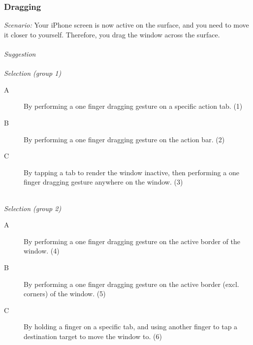 
\subsubsection{Dragging}
\emph{Scenario:}
Your iPhone screen is now active on the surface, and you need to move it closer to yourself. Therefore, you drag the window across the surface.
\hfill\\
\hfill\\
\emph{Suggestion}
\hfill\\
\hfill\\
\emph{Selection (group 1)}
\begin{description}
\item[A]{By performing a one finger dragging gesture on a specific action tab. (1)}
\item[B]{By performing a one finger dragging gesture on the action bar. (2)}
\item[C]{By tapping a tab to render the window inactive, then performing a one finger dragging gesture anywhere on the window. (3)}
\end{description}
\hfill\\
\emph{Selection (group 2)}
\begin{description}
\item[A]{By performing a one finger dragging gesture on the active border of the window. (4)}
\item[B]{By performing a one finger dragging gesture on the active border (excl. corners) of the window. (5)}
\item[C]{By holding a finger on a specific tab, and using another finger to tap a destination target to move the window to. (6)}
\end{description}


